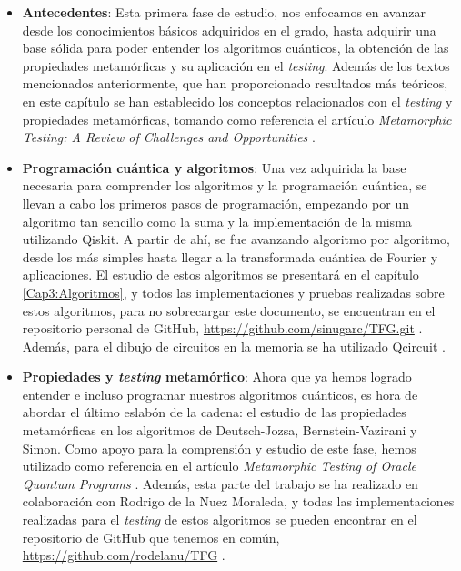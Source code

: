 \begin{itemize}
    \item \textbf{Antecedentes}: Esta primera fase de estudio, nos enfocamos en avanzar desde los conocimientos básicos adquiridos en el grado, hasta adquirir una base sólida para poder entender los algoritmos cuánticos, la obtención de las propiedades metamórficas y su aplicación en el \textit{testing}. Además de los textos mencionados anteriormente, que han proporcionado resultados más teóricos, en este capítulo se han establecido los conceptos relacionados con el \textit{testing} y propiedades metamórficas, tomando como referencia el artículo \textit{Metamorphic Testing: A Review of Challenges and Opportunities} \cite{AR:MTmain:2008}.
    
    \item \textbf{Programación cuántica y algoritmos}: Una vez adquirida la base necesaria para comprender los algoritmos y la programación cuántica, se llevan a cabo los primeros pasos de programación, empezando por un algoritmo tan sencillo como la suma y la implementación de la misma utilizando Qiskit. A partir de ahí, se fue avanzando algoritmo por algoritmo, desde los más simples hasta llegar a la transformada cuántica de Fourier y aplicaciones. El estudio de estos algoritmos se presentará en el capítulo \ref{Cap3:Algoritmos}, y todos las implementaciones y pruebas realizadas sobre estos algoritmos, para no sobrecargar este documento, se encuentran en el repositorio personal de GitHub, \url{https://github.com/sinugarc/TFG.git} . Además, para el dibujo de circuitos en la memoria se ha utilizado Qcircuit \cite{AR:QcircT:2004}. 
    
    \item \textbf{Propiedades y \textit{testing} metamórfico}: Ahora que ya hemos logrado entender e incluso programar nuestros algoritmos cuánticos, es hora de abordar el último eslabón de la cadena: el estudio de las propiedades metamórficas en los algoritmos de Deutsch-Jozsa, Bernstein-Vazirani y Simon. Como apoyo para la comprensión y estudio de este fase, hemos utilizado como referencia en el artículo \textit{Metamorphic Testing of Oracle Quantum Programs} \cite{metamorphicAdd:2022}. Además, esta parte del trabajo se ha realizado en colaboración con Rodrigo de la Nuez Moraleda, y todas las implementaciones realizadas para el \textit{testing} de estos algoritmos se pueden encontrar en el repositorio de GitHub que tenemos en común, \url{https://github.com/rodelanu/TFG} .
\end{itemize}

